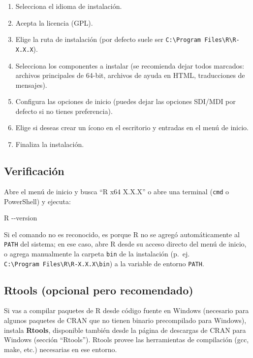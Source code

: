 \documentclass[
  man,
  floatsintext,
  longtable,
  a4paper,
  nolmodern,
  notxfonts,
  notimes,
  12pt,
  colorlinks=true,linkcolor=blue,citecolor=blue,urlcolor=blue]{apa7}
\newenvironment{Shaded}{\begin{snugshade}}{\end{snugshade}}
\newcommand{\AttributeTok}[1]{\textcolor[rgb]{0.40,0.45,0.13}{#1}}
\newcommand{\NormalTok}[1]{\textcolor[rgb]{0.00,0.23,0.31}{#1}}
\providecommand{\tightlist}{%
  \setlength{\itemsep}{0pt}\setlength{\parskip}{0pt}}
\begin{document}
\begin{enumerate}
\def\labelenumi{\arabic{enumi}.}
\tightlist
\item
  Selecciona el idioma de instalación.
\item
  Acepta la licencia (GPL).
\item
  Elige la ruta de instalación (por defecto suele ser
  \texttt{C:\textbackslash{}Program\ Files\textbackslash{}R\textbackslash{}R-X.X.X}).
\item
  Selecciona los componentes a instalar (se recomienda dejar todos
  marcados: archivos principales de 64-bit, archivos de ayuda en HTML,
  traducciones de mensajes).
\item
  Configura las opciones de inicio (puedes dejar las opciones SDI/MDI
  por defecto si no tienes preferencia).
\item
  Elige si deseas crear un ícono en el escritorio y entradas en el menú
  de inicio.
\item
  Finaliza la instalación.
\end{enumerate}

\subsection{Verificación}\label{verificaciuxf3n}

Abre el menú de inicio y busca ``R x64 X.X.X'' o abre una terminal
(\texttt{cmd} o PowerShell) y ejecuta:

\begin{Shaded}
\begin{Highlighting}[]
\NormalTok{R {-}}\AttributeTok{{-}version}
\end{Highlighting}
\end{Shaded}

Si el comando no es reconocido, es porque R no se agregó automáticamente
al \texttt{PATH} del sistema; en ese caso, abre R desde su acceso
directo del menú de inicio, o agrega manualmente la carpeta \texttt{bin}
de la instalación (p.~ej.
\texttt{C:\textbackslash{}Program\ Files\textbackslash{}R\textbackslash{}R-X.X.X\textbackslash{}bin})
a la variable de entorno \texttt{PATH}.

\subsection{Rtools (opcional pero
recomendado)}\label{rtools-opcional-pero-recomendado}

Si vas a compilar paquetes de R desde código fuente en Windows
(necesario para algunos paquetes de CRAN que no tienen binario
precompilado para Windows), instala \textbf{Rtools}, disponible también
desde la página de descargas de CRAN para Windows (sección ``Rtools'').
Rtools provee las herramientas de compilación (gcc, make, etc.)
necesarias en ese entorno.
\end{document}
